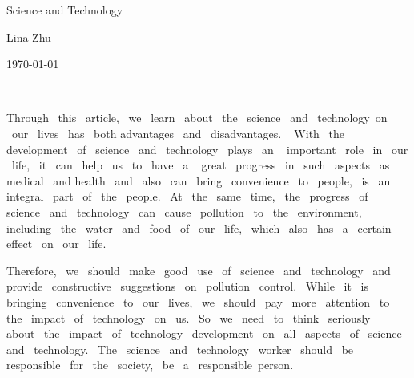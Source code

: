 \documentclass{article}
\begin{document}
	
	
	
	\begin{center}
		
		Science and Technology
	\end{center}
	\begin{center}
	Lina Zhu
	\end{center}
	\begin{center}
		\today
	\end{center}
	
	 \par Through~ this ~article,~ we ~learn~ about ~the~ science~  and~
	 technology~on ~our~ lives~ has~ both advantages ~and ~disadvantages.
	~ With~ the~ development~ of~ science ~and~ technology~ plays ~an ~
	important~ role~ in~ our ~life,~ it~ can ~help~ us ~to~ have~ a ~
	great~ progress~ in~ such ~aspects~ as~ medical~ and health~ and~ 
	also~ can~ bring~ convenience~ to~ people,~ is~ an~ integral~ part~
	of~ the~ people.~ At~ the~ same~ time,~ the~ progress~ of~ science~
	and~ technology~ can~ cause~ pollution~ to~ the~ environment,~
	including~ the~ water~ and~ food~ of~ our~ life,~ which~ also~ has~
	a ~certain~ effect~ on~ our~ life.~
	
	\par Therefore,~ we~ should~ make~ good~ use~ of~ science~ and~
	technology ~and~ provide~ constructive~ suggestions~ on~ pollution~
	control.~ While~ it~ is~ bringing~ convenience~ to~ our~ lives,~ we~
	should~ pay~ more~ attention~ to~ the~ impact~ of~ technology~ on~ 
	us.~ So~ we~ need~ to~ think~ seriously~ about~ the~ impact~ of~
	technology~ development~ on~ all~ aspects~ of~ science~ and~ 
	technology.~ The~ science~ and~ technology~ worker~ should~ be~
	responsible~ for~ the~ society,~ be~ a~ responsible~person.
	
\end{document}
